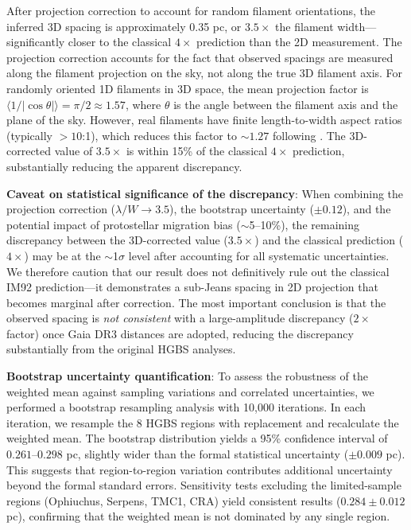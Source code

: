\documentclass[twoside,twocolumn]{mnras}
\begin{document}
After projection correction to account for random filament orientations, the inferred 3D spacing is approximately 0.35 pc, or $3.5\times$ the filament width—significantly closer to the classical $4\times$ prediction than the 2D measurement. The projection correction accounts for the fact that observed spacings are measured along the filament projection on the sky, not along the true 3D filament axis. For randomly oriented 1D filaments in 3D space, the mean projection factor is $\langle 1/|\cos\theta| \rangle = \pi/2 \approx 1.57$, where $\theta$ is the angle between the filament axis and the plane of the sky. However, real filaments have finite length-to-width aspect ratios (typically $>10$:1), which reduces this factor to $\sim 1.27$ following \citet{Hacar2013}. The 3D-corrected value of $3.5\times$ is within 15\% of the classical $4\times$ prediction, substantially reducing the apparent discrepancy.

\textbf{Caveat on statistical significance of the discrepancy}: When combining the projection correction ($\lambda/W \to 3.5$), the bootstrap uncertainty ($\pm 0.12$), and the potential impact of protostellar migration bias ($\sim$5--10\%), the remaining discrepancy between the 3D-corrected value ($3.5\times$) and the classical prediction ($4\times$) may be at the $\sim$1$\sigma$ level after accounting for all systematic uncertainties. We therefore caution that our result does not definitively rule out the classical IM92 prediction---it demonstrates a sub-Jeans spacing in 2D projection that becomes marginal after correction. The most important conclusion is that the observed spacing is \textit{not consistent} with a large-amplitude discrepancy ($2\times$ factor) once Gaia DR3 distances are adopted, reducing the discrepancy substantially from the original HGBS analyses.

\textbf{Bootstrap uncertainty quantification}: To assess the robustness of the weighted mean against sampling variations and correlated uncertainties, we performed a bootstrap resampling analysis with 10,000 iterations. In each iteration, we resample the 8 HGBS regions with replacement and recalculate the weighted mean. The bootstrap distribution yields a 95\% confidence interval of $0.261$--$0.298$ pc, slightly wider than the formal statistical uncertainty ($\pm 0.009$ pc). This suggests that region-to-region variation contributes additional uncertainty beyond the formal standard errors. Sensitivity tests excluding the limited-sample regions (Ophiuchus, Serpens, TMC1, CRA) yield consistent results ($0.284 \pm 0.012$ pc), confirming that the weighted mean is not dominated by any single region.
\end{document}
